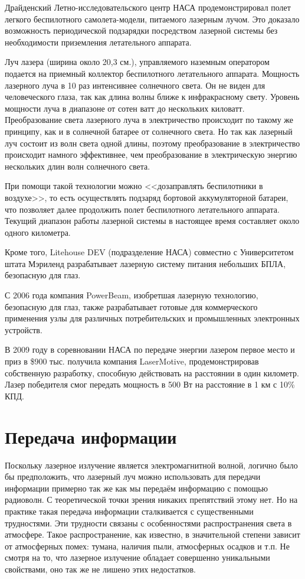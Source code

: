 \documentclass[14pt,pscyr,titlepage]{hedreport}
\begin{document}
		Драйденский Летно-исследовательского центр НАСА продемонстрировал полет 
		легкого беспилотного самолета-модели, питаемого лазерным лучом. Это 
		доказало возможность периодической подзарядки посредством лазерной 
		системы без необходимости приземления летательного аппарата.

		Луч лазера (ширина около 20,3 см.), управляемого наземным оператором 
		подается на приемный коллектор беспилотного летательного аппарата. 
		Мощность лазерного луча в 10 раз интенсивнее солнечного света. Он не 
		виден для человеческого глаза, так как длина волны ближе к 
		инфракрасному свету. Уровень мощности луча в диапазоне от сотен ватт 
		до нескольких киловатт. Преобразование света лазерного луча в 
		электричество происходит по такому же принципу, как и в солнечной 
		батарее от солнечного света. Но так как лазерный луч состоит из волн 
		света одной длины, поэтому преобразование в электричество происходит 
		намного эффективнее, чем преобразование в электрическую энергию 
		нескольких длин волн солнечного света.

		При помощи такой технологии можно <<дозаправлять беспилотники в 
		воздухе>>, то есть осуществлять подзаряд бортовой аккумуляторной 
		батареи, что позволяет далее продолжить полет беспилотного 
		летательного аппарата. Текущий диапазон работы лазерной системы в 
		настоящее время составляет около одного километра.

		Кроме того, Litehouse DEV (подразделение НАСА) совместно с Университетом 
		штата Мэриленд разрабатывает лазерную систему питания небольших БПЛА, 
		безопасную для глаз.

		С 2006 года компания PowerBeam, изобретшая лазерную технологию, 
		безопасную для глаз, также разрабатывает готовые для коммерческого 
		применения узлы для различных потребительских и промышленных 
		электронных устройств.

		В 2009 году в соревновании НАСА по передаче энергии лазером первое 
		место и приз в \$900 тыс. получила компания LaserMotive, 
		продемонстрировав собственную разработку, способную действовать на 
		расстоянии в один километр. Лазер победителя смог передать мощность 
		в 500 Вт на расстояние в 1 км с 10\% КПД.

	\section{Передача информации}
		Поскольку лазерное излучение является электромагнитной волной, 
		логично было бы предположить, что лазерный луч можно использовать 
		для передачи информации примерно так же как мы передаём информацию 
		с помощью радиоволн. С теоретической точки зрения никаких 
		препятствий этому нет. Но на практике такая передача информации 
		сталкивается с существенными трудностями. Эти трудности связаны с 
		особенностями распространения света в атмосфере. Такое распространение, 
		как известно, в значительной степени зависит от атмосферных помех: 
		тумана, наличия пыли, атмосферных осадков и т.п. Не смотря на то, 
		что лазерное излучение обладает совершенно уникальными свойствами, 
		оно так же не лишено этих недостатков.
\end{document}

